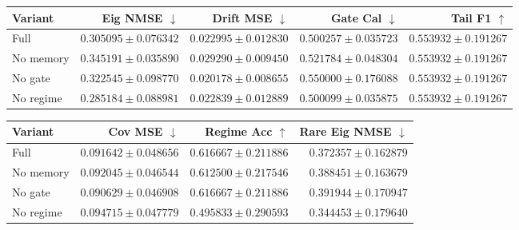 \begingroup
\setlength{\tabcolsep}{4pt}
\scriptsize
\begin{tabular}{@{}lrrrr@{}}
\toprule
Variant & Eig NMSE $\downarrow$ & Drift MSE $\downarrow$ & Gate Cal $\downarrow$ & Tail F1 $\uparrow$ \\
\midrule
Full & $0.305095 \pm 0.076342$ & $0.022995 \pm 0.012830$ & $0.500257 \pm 0.035723$ & $0.553932 \pm 0.191267$ \\
No memory & $0.345191 \pm 0.035890$ & $0.029290 \pm 0.009450$ & $0.521784 \pm 0.048304$ & $0.553932 \pm 0.191267$ \\
No gate & $0.322545 \pm 0.098770$ & $0.020178 \pm 0.008655$ & $0.550000 \pm 0.176088$ & $0.553932 \pm 0.191267$ \\
No regime & $0.285184 \pm 0.088981$ & $0.022839 \pm 0.012889$ & $0.500099 \pm 0.035875$ & $0.553932 \pm 0.191267$ \\
\bottomrule
\end{tabular}

\vspace{0.45em}

\begin{tabular}{@{}lrrr@{}}
\toprule
Variant & Cov MSE $\downarrow$ & Regime Acc $\uparrow$ & Rare Eig NMSE $\downarrow$ \\
\midrule
Full & $0.091642 \pm 0.048656$ & $0.616667 \pm 0.211886$ & $0.372357 \pm 0.162879$ \\
No memory & $0.092045 \pm 0.046544$ & $0.612500 \pm 0.217546$ & $0.388451 \pm 0.163679$ \\
No gate & $0.090629 \pm 0.046908$ & $0.616667 \pm 0.211886$ & $0.391944 \pm 0.170947$ \\
No regime & $0.094715 \pm 0.047779$ & $0.495833 \pm 0.290593$ & $0.344453 \pm 0.179640$ \\
\bottomrule
\end{tabular}
\endgroup
